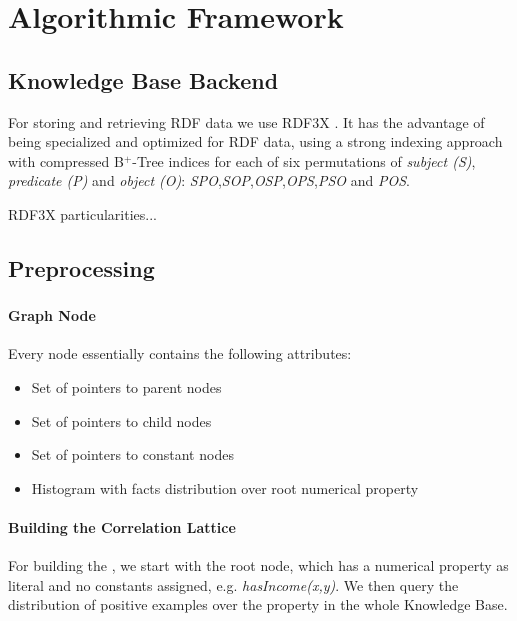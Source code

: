\chapter{Algorithmic Framework}
\label{af:intro}

\section{Knowledge Base Backend}

For storing and retrieving RDF data we use RDF3X \cite{Neumann:2010:RES:1731351.1731354}. It has the advantage of being specialized and optimized for RDF data, using a strong indexing approach with compressed B$^+$-Tree indices for each of six permutations of \emph{subject (S)}, \emph{predicate (P)} and \emph{object (O)}: \emph{SPO},\emph{SOP},\emph{OSP},\emph{OPS},\emph{PSO} and \emph{POS}.

RDF3X particularities...

\section{Preprocessing}

\subsection{\graphname}

\subsubsection{Graph Node}

Every node essentially contains the following attributes:

\begin{itemize}
 \item Set of pointers to parent nodes
 \item Set of pointers to child nodes
 \item Set of pointers to constant nodes
 \item Histogram with facts distribution over root numerical property
\end{itemize}


\subsubsection{Building the Correlation Lattice}

For building the \graphname, we start with the root node, which has a numerical property as literal and no constants assigned, e.g. \emph{hasIncome(x,y)}. We then query the  distribution of positive examples over the property in the whole Knowledge Base.

